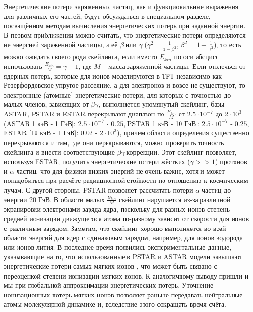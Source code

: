 \documentclass[a4paper,12pt]{article}
\begin{document}
\begin{large}
    Энергетические потери заряженных частиц, как и функциональные выражения для различных его частей, будут обсуждаться в специальном разделе, посвящённом методам вычисления энергетических потерь при заданной энергии.
    В первом приближении можно считать, что энергетические потери определяются не энергией заряженной частицы, а её $\beta$ или $\gamma$ ($\gamma^2=\frac{1}{1-\beta^2}$, $\beta^2=1-\frac{1}{\gamma^2}$), то есть можно ожидать своего рода скейлинга, если вместо $E_{kin}$ по оси абсцисс использовать $\frac{E_{kin}}{M}=\gamma-1$, где $M$ -- масса заряженной частицы.
    Если отвлечься от ядерных потерь, которые для ионов моделируются в ТРТ независимо как Резерфордовское упругое рассеяние, а для электронов и вовсе не существуют, то электронные (атомные) энергетические потери, для которых с точностью до малых членов, зависящих от $\beta\gamma$, выполняется упомянутый скейлинг, базы ASTAR, PSTAR и ESTAR перекрывают диапазон по $\frac{E_{kin}}{M}$ от $2.5\cdot 10^{-7}$ до $2\cdot 10^3$ (ASTAR[1 кэВ - 1 ГэВ]: $2.5\cdot 10^{-7}$ - $0.25$, PSTAR[1 кэВ - 10 ГэВ]: $2.5\cdot 10^{-7}$ - $0.25$, ESTAR [10 кэВ - 1 ГэВ]: $0.02$ - $2\cdot 10^3$), причём области определения существенно перекрываются и там, где они перекрываются, можно проверить точность скейлинга и внести соответствующие $\beta\gamma$ коррекции.
    Этот скейлинг позволяет, используя ESTAR, получить энергетические потери жёстких ($\gamma >> 1$) протонов и $\alpha$-частиц, что для физики низких энергий не очень важно, хотя и может понадобиться при расчёте радиационной стойкости по отношению к космическим лучам.
    С другой стороны, PSTAR позволяет рассчитать потери $\alpha$-частиц до энергии 20 ГэВ.
    В области малых $\frac{E_{kin}}{M}$ скейлинг нарушается из-за различной экранировки электронами заряда ядра, поскольку для разных ионов степень средней ионизации движущегося атома по-разному зависит от скорости для ионов с различным зарядом.
    Заметим, что скейлинг хорошо выполняется во всей области энергий для ядер с одинаковым зарядом, например, для ионов водорода или ионов лития.
    В последнее время появились экспериментальные данные, указывающие на то, что использованные в PSTAR и ASTAR модели завышают энергетические потери самых мягких ионов \cite{Paul1, Paul2, Paul3}, что может быть связано с переоценкой степени ионизации мягких ионов.
    К аналогичному выводу пришли и мы при глобальной аппроксимации энергетических потерь.
    Уточнение ионизационных потерь мягких ионов позволяет раньше передавать нейтральные атомы молекулярной динамике и, вследствие этого сокращать время счёта.


\end{large}
\end{document}
